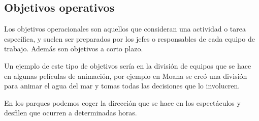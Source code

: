 \subsection{Objetivos operativos}
Los objetivos operacionales son aquellos que consideran una actividad o tarea específica, y suelen ser preparados por los jefes o responsables de cada equipo de trabajo. Además son objetivos a corto plazo.

Un ejemplo de este tipo de objetivos sería en la división de equipos que se hace en algunas películas de animación, por ejemplo en Moana se creó una división para animar el agua del mar y tomas todas las decisiones que lo involucren.

En los parques podemos coger la dirección que se hace en los espectáculos y desfilen que ocurren a determinadas horas.